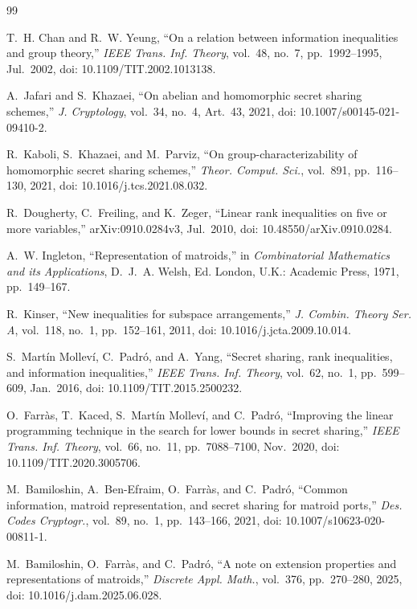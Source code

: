 \documentclass[journal]{IEEEtran}
\begin{document}
\begin{thebibliography}{99}

T.~H. Chan and R.~W. Yeung,
``On a relation between information inequalities and group theory,''
\emph{IEEE Trans. Inf. Theory}, vol.~48, no.~7, pp.~1992--1995, Jul.~2002,
doi: 10.1109/TIT.2002.1013138.

A.~Jafari and S.~Khazaei,
``On abelian and homomorphic secret sharing schemes,''
\emph{J. Cryptology}, vol.~34, no.~4, Art.~43, 2021,
doi: 10.1007/s00145-021-09410-2.

R.~Kaboli, S.~Khazaei, and M.~Parviz,
``On group-characterizability of homomorphic secret sharing schemes,''
\emph{Theor. Comput. Sci.}, vol.~891, pp.~116--130, 2021,
doi: 10.1016/j.tcs.2021.08.032.

R.~Dougherty, C.~Freiling, and K.~Zeger,
``Linear rank inequalities on five or more variables,''
arXiv:0910.0284v3, Jul.~2010, doi: 10.48550/arXiv.0910.0284.

A.~W. Ingleton,
``Representation of matroids,'' in \emph{Combinatorial Mathematics and its
Applications}, D.~J.~A. Welsh, Ed. London, U.K.: Academic Press, 1971,
pp.~149--167.

R.~Kinser,
``New inequalities for subspace arrangements,''
\emph{J. Combin. Theory Ser. A}, vol.~118, no.~1, pp.~152--161, 2011,
doi: 10.1016/j.jcta.2009.10.014.

S.~Mart\'in Mollev\'i, C.~Padr\'o, and A.~Yang,
``Secret sharing, rank inequalities, and information inequalities,''
\emph{IEEE Trans. Inf. Theory}, vol.~62, no.~1, pp.~599--609, Jan.~2016,
doi: 10.1109/TIT.2015.2500232.

O.~Farr\`as, T.~Kaced, S.~Mart\'in Mollev\'i, and C.~Padr\'o,
``Improving the linear programming technique in the search for lower bounds in
secret sharing,'' \emph{IEEE Trans. Inf. Theory}, vol.~66, no.~11,
pp.~7088--7100, Nov.~2020, doi: 10.1109/TIT.2020.3005706.

M.~Bamiloshin, A.~Ben-Efraim, O.~Farr\`as, and C.~Padr\'o,
``Common information, matroid representation, and secret sharing for matroid
ports,'' \emph{Des. Codes Cryptogr.}, vol.~89, no.~1, pp.~143--166, 2021,
doi: 10.1007/s10623-020-00811-1.

M.~Bamiloshin, O.~Farr\`as, and C.~Padr\'o,
``A note on extension properties and representations of matroids,''
\emph{Discrete Appl. Math.}, vol.~376, pp.~270--280, 2025,
doi: 10.1016/j.dam.2025.06.028.


\end{thebibliography}
\end{document}
